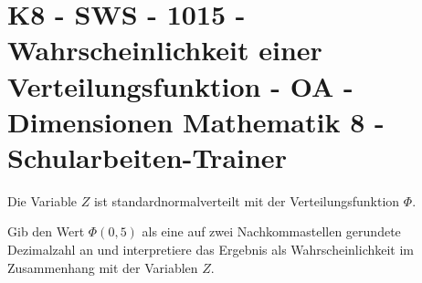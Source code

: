 \section{K8 - SWS - 1015 - Wahrscheinlichkeit einer Verteilungsfunktion - OA - Dimensionen Mathematik 8 - Schularbeiten-Trainer}

\begin{beispiel}[K8 - SWS]{1}
Die Variable $Z$ ist standardnormalverteilt mit der Verteilungsfunktion $\Phi$.

Gib den Wert $\Phi(0,5)$ als eine auf zwei Nachkommastellen gerundete Dezimalzahl an und interpretiere das Ergebnis als Wahrscheinlichkeit im Zusammenhang mit der Variablen $Z$.

\end{beispiel}